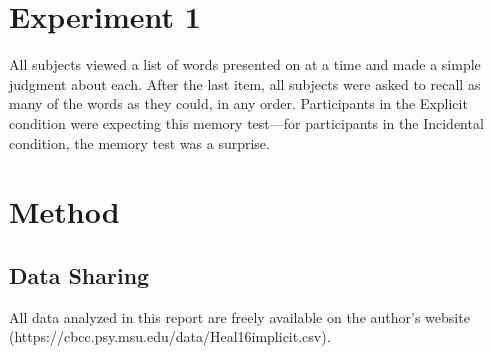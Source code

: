 \documentclass[man,natbib,floatsintext]{apa6} %
\begin{document}


\section{Experiment 1}

All subjects viewed a list of words presented on at a time and made a simple judgment about each. After the last item, all subjects were asked to recall as many of the words as they could, in any order. Participants in the Explicit condition were expecting this memory test---for participants in the Incidental condition, the memory test was a surprise. 

\section{Method}

\newcommand\listlength{16} %
\newcommand\presrate{4 seconds} %
\newcommand\isi{1 second} %
\newcommand\DFRDelay{16 second} %
\newcommand\recalltime{75 seconds} %
\newcommand\totalss{XX}
\newcommand\totalexcluded{XX}



\subsection{Data Sharing}All data analyzed in this report are freely available on the author's website (https://cbcc.psy.msu.edu/data/Heal16implicit.csv).
\end{document}
